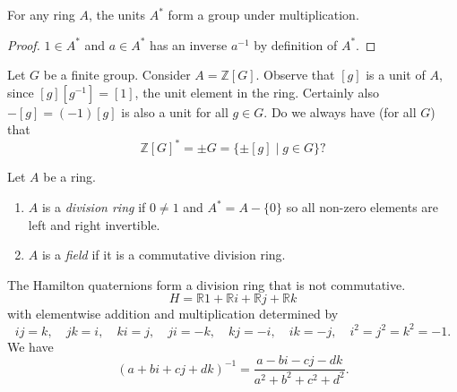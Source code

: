 \begin{prop}
For any ring $A$, the units $A^\ast$ form a group under multiplication.
\end{prop}
\begin{proof}
$1 \in A^\ast$ and $a \in A^\ast$ has an inverse $a^{-1}$ by
definition of $A^\ast$.
\end{proof}

Let $G$ be a finite group. Consider $A = \mathbb{Z}[G]$. Observe
that $[g]$ is a unit of $A$, since $[g] [g^{-1}] = [1]$, the unit
element in the ring. Certainly also $-[g] = (-1)[g]$ is also a unit
for all $g \in G$. Do we always have (for all $G$) that
$$
\mathbb{Z}[G]^\ast = \pm G = \{ \pm [g] \mid g \in G \}?
$$

\begin{defn}
Let $A$ be a ring.
\begin{enumerate}
  \item{
    $A$ is a \emph{division ring} if $0 \neq 1$ and
    $A^\ast = A - \{ 0 \}$ so all non-zero elements are left and right invertible.
  }
  \item{
    $A$ is a \emph{field} if it is a commutative division ring.
  }
\end{enumerate}
\end{defn}

\begin{xmpl}
The Hamilton quaternions form a division ring that is not commutative.
$$
H = \mathbb{R} 1 + \mathbb{R} i + \mathbb{R} j + \mathbb{R} k
$$
with elementwise addition and multiplication determined by
$$
ij = k, \quad
jk = i, \quad
ki = j, \quad
ji = -k, \quad
kj = -i, \quad
ik = -j, \quad
i^2 = j^2 = k^2 = -1.
$$
We have
$$
(a + bi + cj + dk)^{-1} =
\frac{a - bi - cj - dk}{a^2 + b^2 + c^2 + d^2}.
$$
\end{xmpl}
